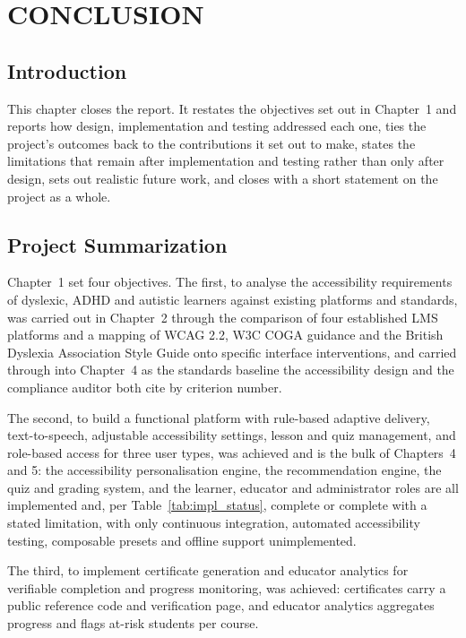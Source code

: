 \documentclass[12pt, oneside]{article} %
\begin{document}
\newpage
\section{CONCLUSION}
\label{sec:conclusion}

\subsection{Introduction}

This chapter closes the report. It restates the objectives set out in Chapter~1 and reports how design, implementation and testing addressed each one, ties the project's outcomes back to the contributions it set out to make, states the limitations that remain after implementation and testing rather than only after design, sets out realistic future work, and closes with a short statement on the project as a whole.

\subsection{Project Summarization}

Chapter~1 set four objectives. The first, to analyse the accessibility requirements of dyslexic, ADHD and autistic learners against existing platforms and standards, was carried out in Chapter~2 through the comparison of four established LMS platforms and a mapping of WCAG 2.2, W3C COGA guidance and the British Dyslexia Association Style Guide onto specific interface interventions, and carried through into Chapter~4 as the standards baseline the accessibility design and the compliance auditor both cite by criterion number.

The second, to build a functional platform with rule-based adaptive delivery, text-to-speech, adjustable accessibility settings, lesson and quiz management, and role-based access for three user types, was achieved and is the bulk of Chapters~4 and 5: the accessibility personalisation engine, the recommendation engine, the quiz and grading system, and the learner, educator and administrator roles are all implemented and, per Table~\ref{tab:impl_status}, complete or complete with a stated limitation, with only continuous integration, automated accessibility testing, composable presets and offline support unimplemented.

The third, to implement certificate generation and educator analytics for verifiable completion and progress monitoring, was achieved: certificates carry a public reference code and verification page, and educator analytics aggregates progress and flags at-risk students per course.
\end{document}

